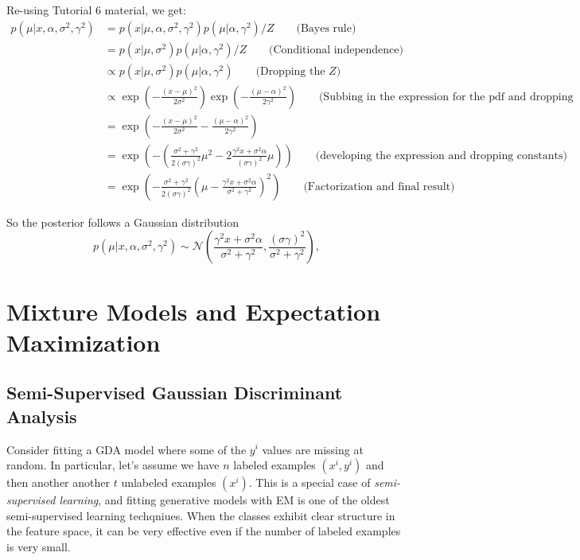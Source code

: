 \documentclass{article}
\begin{document}
Re-using Tutorial 6 material, we get:
\begin{align}
p(\mu | x,\alpha, \sigma^2, \gamma^2) &= p(x| \mu, \alpha, \sigma^2, \gamma^2)p(\mu| \alpha,  \gamma^2) / Z \qquad\text{(Bayes rule)}\\
&= p(x| \mu, \sigma^2)p(\mu| \alpha,  \gamma^2) / Z \qquad\text{(Conditional independence)}\\
&\propto p(x| \mu, \sigma^2)p(\mu| \alpha,  \gamma^2) \qquad\text{(Dropping the }Z)\\
&\propto \exp\left(-\frac{(x - \mu)^2}{2\sigma^2}\right)\exp\left(-\frac{(\mu - \alpha)^2}{2\gamma^2}\right) \qquad\text{(Subbing in the expression for the pdf and dropping constants)}\\
&= \exp\left(-\frac{(x - \mu)^2}{2\sigma^2}-\frac{(\mu - \alpha)^2}{2\gamma^2}\right) \\
&= \exp\left(-\left( \frac{\sigma^2+\gamma^2}{2(\sigma\gamma)^2} \mu^2 - 2\frac{\gamma^2x+\sigma^2\alpha}{(\sigma\gamma)^2}\mu\right)\right) \qquad\text{(developing the expression and dropping constants)}\\
&= \exp\left(- \frac{\sigma^2+\gamma^2}{2(\sigma\gamma)^2} \left(\mu-\frac{\gamma^2x+\sigma^2\alpha}{\sigma^2+\gamma^2}\right)^2\right) \qquad\text{(Factorization and final result)}
\end{align}

So the posterior follows a Gaussian distribution 
\[
p(\mu|x,\alpha,\sigma^2,\gamma^2) \sim \mathcal{N}(\frac{\gamma^2x+\sigma^2\alpha}{\sigma^2+\gamma^2},\frac{(\sigma\gamma)^2}{\sigma^2+\gamma^2}),
\]



\section{Mixture Models and Expectation Maximization}

\subsection{Semi-Supervised Gaussian Discriminant Analysis}

Consider fitting a GDA model where some of the $y^i$ values are missing at random. In particular, let's assume we have $n$ labeled examples $(x^i,y^i)$ and then another another $t$ unlabeled examples $(x^i)$. This is a special case of \emph{semi-supervised learning}, and fitting generative models with EM is one of the oldest semi-supervised learning techqniues. When the classes exhibit clear structure in the feature space, it can be very effective even if the number of labeled examples is very small.
\end{document}
